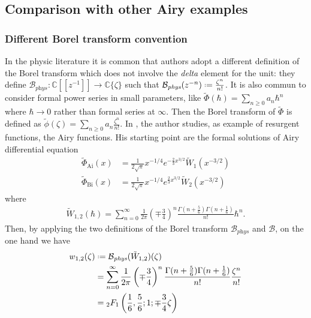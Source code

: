 \documentclass{article}
\newcommand{\C}{\mathbb{C}}
\newcommand*{\defeq}{\mathrel{\vcenter{\baselineskip0.5ex \lineskiplimit0pt
                     \hbox{\scriptsize.}\hbox{\scriptsize.}}}%
                     =}
\begin{document}
\subsection{Comparison with other Airy examples}

\subsubsection{Different Borel transform convention} In the physic literature it is common that authors adopt a different definition of the Borel transform which does not involve the \textit{delta} element for the unit: they define $\mathcal{B}_{\textit{phys}}\colon \C [\![ z^{-1}]\!] \to \C \lbrace \zeta\rbrace$ such that $\mathcal{B}_{\textit{phys}}(z^{-n})\defeq \tfrac{\zeta^n}{n!}$. It is also commun to consider formal power series in small parameters, like $\tilde{\Phi}(\hbar)=\sum_{n\geq 0} a_n\hbar^n$ where $\hbar\to 0$ rather than formal series at $\infty$. Then the Borel transform of $\tilde{\Phi}$ is defined as $\tilde{\phi}(\zeta)=\sum_{n\geq 0}a_n\tfrac{\zeta^n}{n!}$. In \cite{Diablerets}, the author studies, as example of resurgent functions, the Airy functions. His starting point are the formal solutions of Airy differential equation
\begin{align*}
\tilde{\Phi}_{\mathrm{Ai}}(x)&=\frac{1}{2\sqrt{\pi}}x^{-1/4}e^{-\tfrac{2}{3}x^{3/2}}\tilde{W}_1(x^{-3/2})\\
\tilde{\Phi}_{\mathrm{Bi}}(x)&=\frac{1}{2\sqrt{\pi}}x^{-1/4}e^{\tfrac{2}{3}x^{3/2}}\tilde{W}_2(x^{-3/2})
\end{align*}  
where 
\begin{align*}
\tilde{W}_{1,2}(\hbar)=\sum_{n=0}^{\infty}\frac{1}{2\pi}\left(\mp\frac{3}{4}\right)^{n}\frac{\Gamma(n+\frac{5}{6})\Gamma(n+\frac{1}{6})}{n!}\hbar^n.
\end{align*}
Then, by applying the two definitions of the Borel transform $\mathcal{B}_{\textit{phys}}$ and $\mathcal{B}$, on the one hand we have  
\begin{align*}
w_{1,2}(\zeta)&\defeq\mathcal{B}_{\textit{phys}}(\tilde{W}_{1,2})(\zeta)\\
&=\sum_{n=0}^{\infty}\frac{1}{2\pi}\left(\mp\frac{3}{4}\right)^{n}\frac{\Gamma(n+\frac{5}{6})\Gamma(n+\frac{1}{6})}{n!}\frac{\zeta^n}{n!}\\
&={}_2F_1\left(\frac{1}{6},\frac{5}{6};1;\mp\frac{3}{4}\zeta\right) 
\end{align*}
\end{document}
